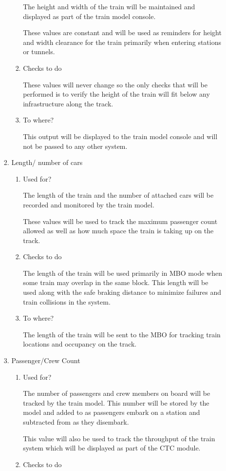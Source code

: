 \documentclass[11pt]{article}
\begin{document}
\begin{enumerate}
\begin{enumerate}
\begin{enumerate}
\begin{enumerate}
The height and width of the train will be maintained and displayed as part of the train model console.

These values are constant and will be used as reminders for height and width clearance for the train primarily when entering stations or tunnels.
\item Checks to do
\label{sec-3-1-4-2-2-2-2}

These values will never change so the only checks that will be performed is to verify the height of the train will fit below any infrastructure along the track.
\item To where?
\label{sec-3-1-4-2-2-2-3}

This output will be displayed to the train model console and will not be passed to any other system.
\end{enumerate}
\item Length/ number of cars
\label{sec-3-1-4-2-2-3}
\begin{enumerate}
\item Used for?
\label{sec-3-1-4-2-2-3-1}

The length of the train and the number of attached cars will be recorded and monitored by the train model.

These values will be used to track the maximum passenger count allowed as well as how much space the train is taking up on the track.
\item Checks to do
\label{sec-3-1-4-2-2-3-2}

The length of the train will be used primarily in MBO mode when some train may overlap in the same block. This length will be used along with the safe braking distance to minimize failures and train collisions in the system.
\item To where?
\label{sec-3-1-4-2-2-3-3}

The length of the train will be sent to the MBO for tracking train locations and occupancy on the track.
\end{enumerate}
\item Passenger/Crew Count
\label{sec-3-1-4-2-2-4}
\begin{enumerate}
\item Used for?
\label{sec-3-1-4-2-2-4-1}

The number of passengers and crew members on board will be tracked by the train model. This number will be stored by the model and added to as passengers embark on a station and subtracted from as they disembark.

This value will also be used to track the throughput of the train system which will be displayed as part of the CTC module.
\item Checks to do
\label{sec-3-1-4-2-2-4-2}


\end{enumerate}
\end{enumerate}
\end{enumerate}
\end{enumerate}
\end{document}
